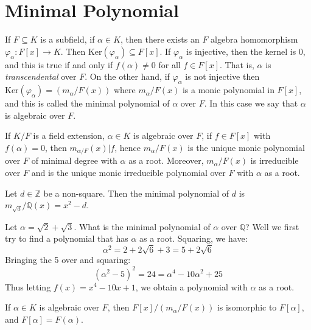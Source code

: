 \section{Minimal Polynomial}
    If $F\subseteq{K}$ is a subfield, if $\alpha\in{K}$, then there exists
    an $F$ algebra homomorphism $\varphi_{\alpha}:F[x]\rightarrow{K}$.
    Then $\textrm{Ker}(\varphi_{\alpha})\subseteq{F}[x]$. If
    $\varphi_{\alpha}$ is injective, then the kernel is 0, and this is
    true if and only if $f(\alpha)\ne{0}$ for all $f\in{F}[x]$. That is,
    $\alpha$ is \textit{transcendental} over $F$. On the other hand, if
    $\varphi_{\alpha}$ is not injective then
    $\textrm{Ker}(\varphi_{\alpha})=(m_{\alpha}/F(x))$ where
    $m_{\alpha}/F(x)$ is a monic polynomial in $F[x]$, and this is called
    the minimal polynomial of $\alpha$ over $F$. In this case we say that
    $\alpha$ is algebraic over $F$.
    \begin{theorem}
        If $K/F$ is a field extension, $\alpha\in{K}$ is algebraic over $F$,
        if $f\in{F}[x]$ with $f(\alpha)=0$, then
        $m_{\alpha/F}(x)|f$, hence $m_{\alpha}/F(x)$ is the unique monic
        polynomial over $F$ of minimal degree with $\alpha$ as a root.
        Moreover, $m_{\alpha}/F(x)$ is irreducible over $F$ and is the
        unique monic irreducible polynomial over $F$ with $\alpha$ as a
        root.
    \end{theorem}
    \begin{example}
        Let $d\in\mathbb{Z}$ be a non-square. Then the minimal polynomial of
        $d$ is $m_{\sqrt{d}}/\mathbb{Q}(x)=x^{2}-d$.
    \end{example}
    \begin{example}
        Let $\alpha=\sqrt{2}+\sqrt{3}$. What is the minimal polynomial of
        $\alpha$ over $\mathbb{Q}$? Well we first try to find a polynomial
        that has $\alpha$ as a root. Squaring, we have:
        \begin{equation}
            \alpha^{2}=2+2\sqrt{6}+3=5+2\sqrt{6}
        \end{equation}
        Bringing the 5 over and squaring:
        \begin{equation}
            (\alpha^{2}-5)^{2}=24=\alpha^{4}-10\alpha^{2}+25
        \end{equation}
        Thus letting $f(x)=x^{4}-10x+1$, we obtain a polynomial with
        $\alpha$ as a root.
    \end{example}
    \begin{theorem}
        If $\alpha\in{K}$ is algebraic over $F$, then
        $F[x]/(m_{\alpha}/F(x))$ is isomorphic to $F[\alpha]$, and
        $F[\alpha]=F(\alpha)$.
    \end{theorem}
